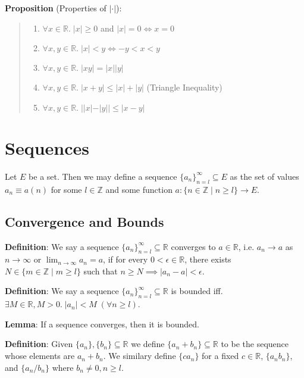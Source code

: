 \documentclass[11pt]{article}
\begin{document}
\textbf{Proposition} (Properties of $|\cdot|$):
\begin{quote}
	\begin{enumerate}
	\item $\forall x \in \mathbb{R}.\; |x| \geq 0$ and $|x| = 0 \iff x = 0$
	\item $\forall x,y \in \mathbb{R}.\; |x| < y \iff -y < x < y$
	\item $\forall x,y \in \mathbb{R}.\; |xy| = |x||y|$
	\item $\forall x,y \in \mathbb{R}.\; |x+y| \leq |x| + |y|$ (Triangle Inequality)
	\item $\forall x,y \in \mathbb{R}.\; ||x|-|y|| \leq |x-y|$
	\end{enumerate}
\end{quote}

\section{Sequences}

Let $E$ be a set. Then we may define a sequence $\{a_n\}_{n=l}^\infty \subseteq E$ as the set of values $a_n \equiv a(n)$ for some $l \in \mathbb{Z}$ and some function $a : \{n \in \mathbb{Z} \mid n \geq l\} \to E$.

\subsection{Convergence and Bounds}

\textbf{Definition}: We say a sequence $\{a_n\}_{n=l}^{\infty} \subseteq \mathbb{R}$ converges to $a \in \mathbb{R}$, i.e. $a_n \to a$ as $n \to \infty$ or $\lim_{n \to \infty} a_n = a$, if for every $0 < \epsilon \in \mathbb{R}$, there exists $N \in \{m \in \mathbb{Z} \mid m \geq l\}$ such that $n \geq N \implies |a_n - a| < \epsilon$.

\textbf{Definition}: We say a sequence $\{a_n\}_{n=l}^{\infty} \subseteq \mathbb{R}$ is bounded iff. $\exists M \in \mathbb{R}, M > 0.\; |a_n| < M \;(\forall n \geq l)$.

\textbf{Lemma}: If a sequence converges, then it is bounded.

\textbf{Definition}: Given $\{a_n\}, \{b_n\} \subseteq \mathbb{R}$ we define $\{a_n + b_n\} \subseteq \mathbb{R}$ to be the sequence whose elements are $a_n + b_n$. We similary define $\{ca_n\}$ for a fixed $c \in \mathbb{R}$, $\{a_nb_n\}$, and $\{a_n/b_n\}$ where $b_n \neq 0, n \geq l$.
\end{document}
